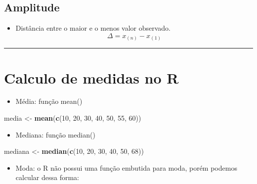 \documentclass[
]{book}
\newenvironment{Shaded}{\begin{snugshade}}{\end{snugshade}}
\newcommand{\DecValTok}[1]{\textcolor[rgb]{0.00,0.00,0.81}{#1}}
\newcommand{\FunctionTok}[1]{\textcolor[rgb]{0.13,0.29,0.53}{\textbf{#1}}}
\newcommand{\NormalTok}[1]{#1}
\newcommand{\OtherTok}[1]{\textcolor[rgb]{0.56,0.35,0.01}{#1}}
\providecommand{\tightlist}{%
  \setlength{\itemsep}{0pt}\setlength{\parskip}{0pt}}
\begin{document}
\subsection{Amplitude}\label{amplitude}

\begin{itemize}
\tightlist
\item
  Distância entre o maior e o menos valor observado.
  \[\Delta = x_{(n)} - x_{(1)}\]
\end{itemize}

\begin{center}\rule{0.5\linewidth}{0.5pt}\end{center}

\section{Calculo de medidas no R}\label{calculo-de-medidas-no-r}

\begin{itemize}
\tightlist
\item
  Média: função mean()
\end{itemize}

\begin{Shaded}
\begin{Highlighting}[]
\NormalTok{media }\OtherTok{\textless{}{-}} \FunctionTok{mean}\NormalTok{(}\FunctionTok{c}\NormalTok{(}\DecValTok{10}\NormalTok{, }\DecValTok{20}\NormalTok{, }\DecValTok{30}\NormalTok{, }\DecValTok{40}\NormalTok{, }\DecValTok{50}\NormalTok{, }\DecValTok{55}\NormalTok{, }\DecValTok{60}\NormalTok{))}
\end{Highlighting}
\end{Shaded}

\begin{itemize}
\tightlist
\item
  Mediana: função median()
\end{itemize}

\begin{Shaded}
\begin{Highlighting}[]
\NormalTok{mediana }\OtherTok{\textless{}{-}} \FunctionTok{median}\NormalTok{(}\FunctionTok{c}\NormalTok{(}\DecValTok{10}\NormalTok{, }\DecValTok{20}\NormalTok{, }\DecValTok{30}\NormalTok{, }\DecValTok{40}\NormalTok{, }\DecValTok{50}\NormalTok{, }\DecValTok{68}\NormalTok{))}
\end{Highlighting}
\end{Shaded}

\begin{itemize}
\tightlist
\item
  Moda: o R não possui uma função embutida para moda, porém podemos calcular dessa forma:
\end{itemize}
\end{document}
